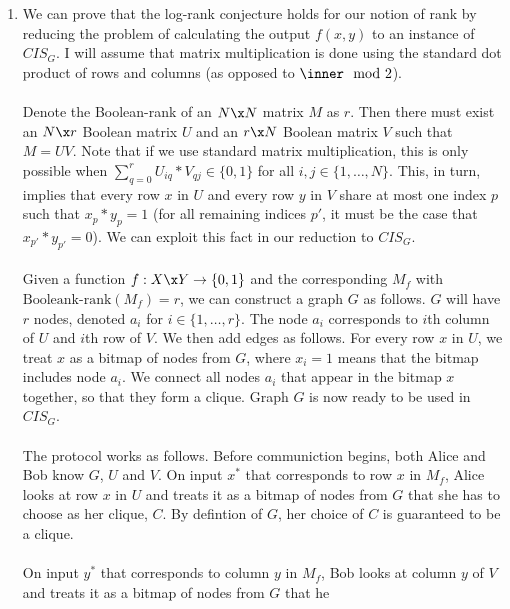 \documentclass{article}
\begin{document}
\begin{enumerate}
    \item We can prove that the log-rank conjecture holds for our notion of
        rank by reducing the problem of calculating the output $f(x, y)$ to an
        instance of $CIS_G$. I will assume that matrix multiplication is done
        using the standard dot product of rows and columns (as opposed to
        $\inner \mod 2$).
        \\\\
        Denote the Boolean-rank of an $N \x N$ matrix $M$ as $r$. Then there
        must exist an $N \x r$ Boolean matrix $U$ and an $r \x N$ Boolean
        matrix $V$ such that $M = UV$. Note that if we use standard matrix
        multiplication, this is only possible when $\sum_{q=0}^r U_{iq} *
        V_{qj} \in \{0,1\}$ for all $i,j \in \{ 1, \ldots, N \}$. This, in
        turn, implies that every row $x$ in $U$ and every row $y$ in $V$ share
        at most one index $p$ such that $x_p * y_p = 1$ (for all remaining
        indices $p'$, it must be the case that $x_{p'} * y_{p'} = 0$). We can
        exploit this fact in our reduction to $CIS_G$.
        \\\\
        Given a function $f: X \x Y \rightarrow \{ 0,1 \}$ and the
        corresponding $M_f$ with $\textrm{Booleank-rank}(M_f) = r$, we can
        construct a graph $G$ as follows. $G$ will have $r$ nodes, denoted
        $a_i$ for $i \in \{ 1, \ldots, r \}.$ The node $a_i$ corresponds to
        $i$th column of $U$ and $i$th row of $V$. We then add edges as follows.
        For every row $x$ in $U$, we treat $x$ as a bitmap of nodes from $G$,
        where $x_i = 1$ means that the bitmap includes node $a_i$.  We connect
        all nodes $a_i$ that appear in the bitmap $x$ together, so that they
        form a clique. Graph $G$ is now ready to be used in $CIS_G$.
        \\\\
        The protocol works as follows. Before communiction begins, both Alice
        and Bob know $G$, $U$ and $V$. On input $x^*$ that corresponds to row
        $x$ in $M_f$, Alice looks at row $x$ in $U$ and treats it as a bitmap
        of nodes from $G$ that she has to choose as her clique, $C$. By
        defintion of $G$, her choice of $C$ is guaranteed to be a clique.
        \\\\
        On input $y^*$ that corresponds to column $y$ in $M_f$, Bob looks at
        column $y$ of $V$ and treats it as a bitmap of nodes from $G$ that he

\end{enumerate}
\end{document}

